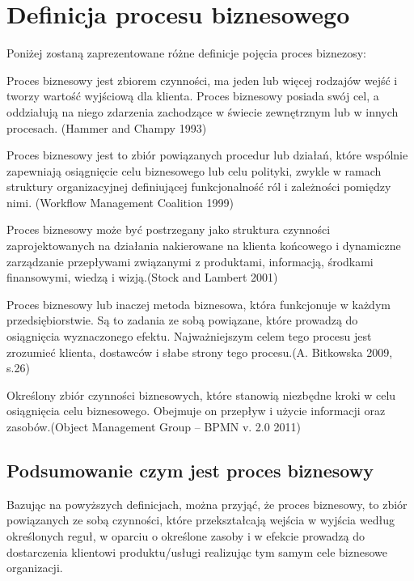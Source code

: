 \documentclass[a4paper, 12pt]{article}
\begin{document}
\section{Definicja procesu biznesowego}
\hspace*{1.5 cm}Poniżej zostaną zaprezentowane różne definicje pojęcia proces biznezosy:

\hspace*{1.5 cm}Proces biznesowy jest zbiorem czynności, ma jeden lub więcej rodzajów wejść i tworzy wartość wyjściową dla klienta. Proces biznesowy posiada swój cel, a oddziałują na niego zdarzenia zachodzące w świecie zewnętrznym lub w innych procesach.
(Hammer and Champy 1993)

\hspace*{1.5 cm} Proces biznesowy jest to zbiór powiązanych procedur lub działań, które wspólnie zapewniają osiągnięcie celu biznesowego lub celu polityki, zwykle w ramach struktury organizacyjnej definiującej funkcjonalność ról i zależności pomiędzy nimi. (Workflow Management Coalition 1999) 

\hspace*{1.5 cm}Proces biznesowy może być postrzegany jako struktura czynności zaprojektowanych na działania nakierowane na klienta końcowego i dynamiczne zarządzanie przepływami związanymi z produktami, informacją, środkami finansowymi, wiedzą i wizją.(Stock and Lambert 2001)        

\hspace*{1.5 cm}Proces biznesowy lub inaczej metoda biznesowa, która funkcjonuje w każdym przedsiębiorstwie. Są to zadania ze sobą powiązane, które prowadzą do osiągnięcia wyznaczonego efektu. Najważniejszym celem tego procesu jest zrozumieć klienta, dostawców i słabe strony tego procesu.(A. Bitkowska 2009, s.26)

\hspace*{1.5 cm}Określony zbiór czynności biznesowych, które stanowią niezbędne kroki w celu osiągnięcia celu biznesowego. Obejmuje on przepływ i użycie informacji oraz zasobów.(Object Management Group – BPMN v. 2.0 2011) 
\subsection{Podsumowanie czym jest proces biznesowy} 
\hspace{1.5 cm} Bazując na powyższych definicjach, można przyjąć, że proces biznesowy, to zbiór powiązanych ze sobą czynności, które przekształcają wejścia w wyjścia według określonych reguł, w oparciu o określone zasoby i w efekcie prowadzą do dostarczenia klientowi produktu/usługi realizując tym samym cele biznesowe organizacji.
\end{document}
